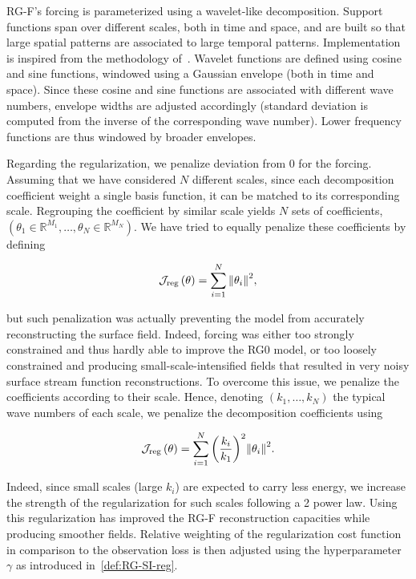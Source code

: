 \documentclass[
  draft
]{agujournal2025}
\begin{document}
RG-F's forcing is parameterized using a wavelet-like decomposition. Support functions span over different scales, both in time and space, and are built so that large spatial patterns are associated to large temporal patterns. Implementation is inspired from the methodology of~\cite{leguillou2025}. Wavelet functions are defined using cosine and sine functions, windowed using a Gaussian envelope (both in time and space). Since these cosine and sine functions are associated with different wave numbers, envelope widths are adjusted accordingly (standard deviation is computed from the inverse of the corresponding wave number). Lower frequency functions are thus windowed by broader envelopes.

Regarding the regularization, we penalize deviation from 0 for the forcing. Assuming that we have considered $N$ different scales, since each decomposition coefficient weight a single basis function, it can be matched to its corresponding scale. Regrouping the coefficient by similar scale yields $N$ sets of coefficients, $\left( \theta_1 \in \mathbb{R}^{M_1}, \dots, \theta_N \in \mathbb{R}^{M_N} \right)$. We have tried to equally penalize these coefficients by defining

\begin{equation}
    \loss{reg}\left(\theta\right) = \sum_{i=1}^{N} {\lVert \theta_{i} \rVert}^2,
\end{equation}

but such penalization was actually preventing the model from accurately reconstructing the surface field. Indeed, forcing was either too strongly constrained and thus hardly able to improve the RG0 model, or too loosely constrained and producing small-scale-intensified fields that resulted in very noisy surface stream function reconstructions. To overcome this issue, we penalize the coefficients according to their scale. Hence, denoting $\left( k_1, \dots, k_N \right)$ the typical wave numbers of each scale, we penalize the decomposition coefficients using


\begin{equation}
    \loss{reg}\left(\theta\right) = \sum_{i=1}^{N} {\left( \frac{k_i}{k_1} \right)}^{2}{\lVert \theta_{i} \rVert}^2.
\end{equation}

Indeed, since small scales (large $k_i$) are expected to carry less energy, we increase the strength of the regularization for such scales following a 2 power law. Using this regularization has improved the RG-F reconstruction capacities while producing smoother fields. Relative weighting of the regularization cost function in comparison to the observation loss is then adjusted using the hyperparameter $\gamma$ as introduced in~\cref{def:RG-SI-reg}.
\end{document}
